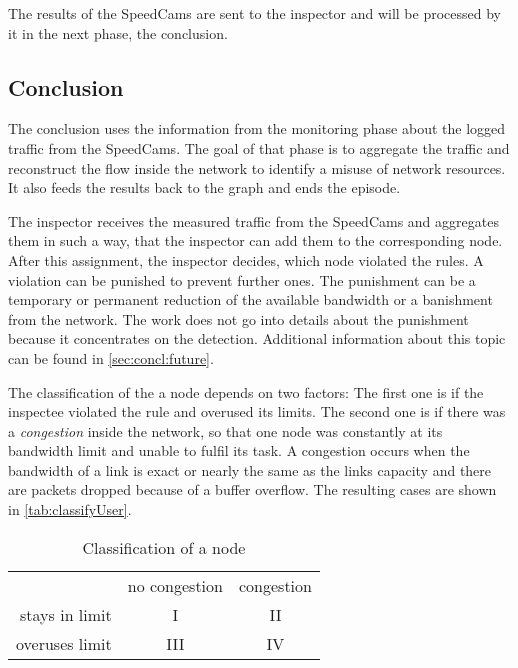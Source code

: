 \documentclass[thesis.tex]{subfiles}
\begin{document}
The results of the SpeedCams are sent to the inspector and will be processed by it in the next phase, the conclusion.

\subsection{Conclusion} \label{sec:main:conclusionphase} 
The conclusion uses the information from the monitoring phase about the logged traffic from the SpeedCams. The goal of that phase is to aggregate the traffic and reconstruct the flow inside the network to identify a misuse of network resources. It also feeds the results back to the graph and ends the episode.

The inspector receives the measured traffic from the SpeedCams and aggregates them in such a way, that the inspector can add them to the corresponding node. After this assignment, the inspector decides, which node violated the rules. A violation can be punished to prevent further ones. The punishment can be a temporary or permanent reduction of the available bandwidth or a banishment from the network. The work does not go into details about the punishment because it concentrates on the detection. Additional information about this topic can be found in \autoref{sec:concl:future}.

The classification of the a node depends on two factors: The first one is if the inspectee violated the rule and overused its limits. The second one is if there was a \textit{congestion} inside the network, so that one node was constantly at its bandwidth limit and unable to fulfil its task. A congestion occurs when the bandwidth of a link is exact or nearly the same as the links capacity and there are packets dropped because of a buffer overflow. The resulting cases are shown in \autoref{tab:classifyUser}.

\begin{table}[h]
    \centering
    \begin{tabular}{ r|c|c| }
        \multicolumn{1}{r}{}
        &  \multicolumn{1}{c}{no congestion}
        & \multicolumn{1}{c}{congestion} \\
        \cline{2-3}
        stays in limit & I & II \\
        \cline{2-3}
        overuses limit & III & IV \\
        \cline{2-3}
    \end{tabular}
    \caption{Classification of a node}
    \label{tab:classifyUser}    
\end{table}
\end{document}
